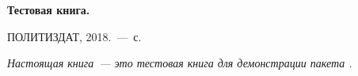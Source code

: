 \vspace*{80pt}
\noindent
\textbf{Тестовая книга.}

\smallskip

\noindent
ПОЛИТИЗДАТ, 2018.~--- \thelastpage{}\,с.
\vfill

{
  \itshape\small
  Настоящая книга~--- это тестовая книга для демонстрации
  пакета .
}
\thispagestyle{empty}
